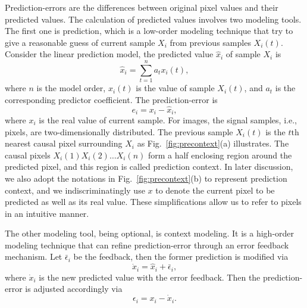 \documentclass[journal]{IEEEtran}
\begin{document}
Prediction-errors are the differences between original pixel values and their predicted values. The
calculation of predicted values involves two modeling tools. The first one is prediction, which is a
low-order modeling technique that try to give a reasonable guess of current sample $X_i$ from
previous samples $X_i(t)$. Consider the linear prediction model, the predicted value $\hat{x}_i$ of
sample $X_i$ is
\begin{equation}\label{eqn:predict}
	\hat{x}_i = \sum^n_{t=1} a_t x_i(t),
\end{equation}
where $n$ is the model order, $x_i(t)$ is the value of sample $X_i(t)$, and $a_t$ is the
corresponding predictor coefficient. The prediction-error is 
\begin{equation}
	e_i = x_i - \hat{x}_i,
\end{equation}
where $x_i$ is the real value of current sample. For images, the signal samples, i.e., pixels, are
two-dimensionally distributed. The previous sample $X_i(t)$ is the $t\mbox{th}$ nearest causal pixel
surrounding $X_i$ as Fig.\ \ref{fig:precontext}(a) illustrates. The causal pixels $X_i(1)X_i(2)\dots
X_i(n)$ form a half enclosing region around the predicted pixel, and this region is called
prediction context. In later discussion, we also adopt the notations in Fig.\
\ref{fig:precontext}(b) to represent prediction context, and we indiscriminatingly use $x$ to denote
the current pixel to be predicted as well as its real value. These simplifications allow us to refer
to pixels in an intuitive manner.

The other modeling tool, being optional, is context modeling. It is a high-order modeling technique
that can refine prediction-error through an error feedback mechanism. Let $\bar{\epsilon}_i$ be the
feedback, then the former prediction is modified via
\begin{equation}\label{eqn:feedback}
    \dot{x}_i = \hat{x}_i + \bar{\epsilon}_i,
\end{equation}
where $\dot{x}_i$ is the new predicted value with the error feedback. Then the prediction-error is
adjusted accordingly via 
\begin{equation}
  \epsilon_i = x_i - \dot{x}_i. 
\end{equation}
\end{document}
